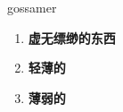 
\begin{frame}
{\huge gossamer}
\begin{center}
\begin{enumerate}\Large
  \item \textbf{虚无缥缈的东西}
  \item \textbf{轻薄的}
  \item \textbf{薄弱的}
\end{enumerate}
\end{center}
\end{frame}
